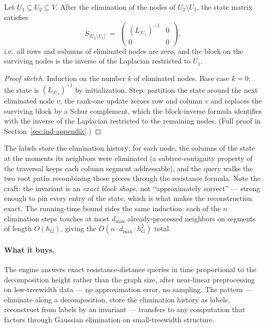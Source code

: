 \begin{lemma}
\label{lem:ind-elim-state}
Let $U_1 \subseteq U_2 \subseteq V$. After the elimination of the nodes of
$U_2 \setminus U_1$, the state matrix satisfies
\[
S_{|U_2 \setminus U_1|}
\;=\;
\begin{pmatrix} (L_{|U_1})^{-1} & 0 \\[2pt] 0 & 0 \end{pmatrix},
\]
i.e.\ all rows and columns of eliminated nodes are zero, and the block on the surviving
nodes is the inverse of the Laplacian restricted to $U_1$. \eop
\end{lemma}

\begin{proof}[Proof sketch]
Induction on the number $k$ of eliminated nodes. Base case $k=0$: the state is
$(L_{|U_2})^{-1}$ by initialization. Step: partition the state around the next
eliminated node $v$; the rank-one update zeroes row and column $v$ and replaces the
surviving block by a Schur complement, which the block-inverse formula identifies with
the inverse of the Laplacian restricted to the remaining nodes. (Full proof in
Section~\ref{sec:ind-appendix}.)
\end{proof}

The labels store the elimination history: for each node, the columns of the state at
the moments its neighbors were eliminated (a subtree-contiguity property of the
traversal keeps each column segment addressable), and the query walks the two root
paths recombining those pieces through the resistance formula. Note the craft: the
invariant is an \emph{exact block shape}, not ``approximately correct'' --- strong
enough to pin every entry of the state, which is what makes the reconstruction exact.
The running-time bound rides the same induction: each of the $n$ elimination steps
touches at most $d_{\max}$ already-processed neighbors on segments of length $O(h_G)$,
giving the $O(n \cdot d_{\max} \cdot h_G^{2})$ total.

\paragraph{What it buys.}
The engine answers exact resistance-distance queries in time proportional to the
decomposition height rather than the graph size, after near-linear preprocessing on
low-treewidth data --- no approximation error, no sampling. The pattern --- eliminate
along a decomposition, store the elimination history as labels, reconstruct from labels
by an invariant --- transfers to any computation that factors through Gaussian
elimination on small-treewidth structure.

